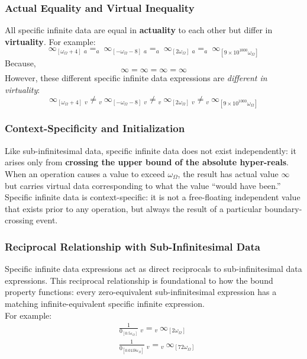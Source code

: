 \documentclass{article}
\begin{document}
\subsubsection{Actual Equality and Virtual Inequality}

All specific infinite data are equal in \textbf{actuality} to each other but differ in \textbf{virtuality}.
For example:
$$\infty_{[\omega_\Omega+4]} \ {}_a{=}_a \ \infty_{[-\omega_\Omega-8]} \ {}_a{=}_a \ \infty_{[2\omega_\Omega]} \ {}_a{=}_a \ \infty_{[9\times10^{1000}\omega_\Omega]}$$ Because,
$$\infty=\infty=\infty=\infty$$ However, these different specific infinite data expressions are \textit{different in virtuality}:
$$\infty_{[\omega_\Omega+4]} \ {}_v{\neq}{}_v \ \infty_{[-\omega_\Omega-8]} \ {}_v{\neq}{}_v \ \infty_{[2\omega_\Omega]} \ {}_v{\neq}{}_v \ \infty_{[9\times10^{1000}\omega_\Omega]}$$

\subsubsection{Context-Specificity and Initialization}

Like sub-infinitesimal data, specific infinite data does not exist independently: 
it arises only from \textbf{crossing the upper bound of the absolute hyper-reals}. 
When an operation causes a value to exceed $\omega_\Omega$, the result has actual 
value $\infty$ but carries virtual data corresponding to what the value ``would 
have been.'' Specific infinite data is context-specific: it is not a free-floating 
independent value that exists prior to any operation, but always the result of a 
particular boundary-crossing event.

\subsubsection{Reciprocal Relationship with Sub-Infinitesimal Data}

Specific infinite data expressions act as direct reciprocals to sub-infinitesimal data expressions. This reciprocal relationship is foundational to how the bound property functions: every zero-equivalent sub-infinitesimal expression has a matching infinite-equivalent specific infinite expression.
\\ 
For example:
\begin{align*}
&\frac{1}{0_{[0.5\varepsilon_\Omega]}} \ {}_v{=}{}_v \ \infty_{[2\omega_\Omega]} \\
&\frac{1}{0_{[0.01\overline{38}\varepsilon_\Omega]}} \ {}_v{=}{}_v \ \infty_{[72\omega_\Omega]}
\end{align*}
\end{document}
